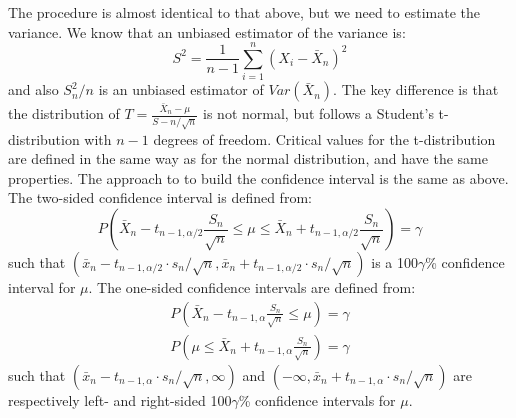 The procedure is almost identical to that above, but we need to estimate the variance. We know that an unbiased estimator of the variance is:
\begin{equation*}
    S^2 = \frac{1}{n-1} \sum_{i=1}^n (X_i - \bar{X}_n)^2
\end{equation*}
and also $S_n^2/n$ is an unbiased estimator of $Var(\bar{X}_n)$. The key difference is that the distribution of $T = \frac{\bar{X}_n - \mu}{S-n / \sqrt{n}}$ is not normal, but follows a Student's t-distribution with $n-1$ degrees of freedom.
Critical values for the t-distribution are defined in the same way as for the normal distribution, and have the same properties.
The approach to to build the confidence interval is the same as above. The two-sided confidence interval is defined from:
\begin{equation*}
    P(\bar{X}_n - t_{n-1, \alpha/2} \frac{S_n}{\sqrt{n}} \leq \mu \leq \bar{X}_n + t_{n-1, \alpha/2} \frac{S_n}{\sqrt{n}}) = \gamma
\end{equation*}
such that $(\bar{x}_n - t_{n-1, \alpha/2} \cdot s_n/\sqrt{n}, \bar{x}_n + t_{n-1, \alpha/2} \cdot s_n/\sqrt{n})$ is a 100$\gamma$\% confidence interval for $\mu$. The one-sided confidence intervals are defined from:
\begin{gather*}
    P(\bar{X}_n - t_{n-1, \alpha} \frac{S_n}{\sqrt{n}} \leq \mu) = \gamma \\
    P(\mu \leq \bar{X}_n + t_{n-1, \alpha} \frac{S_n}{\sqrt{n}}) = \gamma
\end{gather*}
such that $(\bar{x}_n - t_{n-1, \alpha} \cdot s_n/\sqrt{n}, \infty)$ and $(-\infty, \bar{x}_n + t_{n-1, \alpha} \cdot s_n/\sqrt{n})$ are respectively left- and right-sided 100$\gamma$\% confidence intervals for $\mu$.

